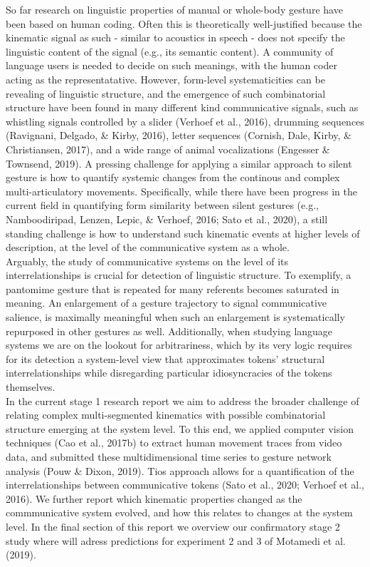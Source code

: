 \documentclass[
  man, noextraspace,floatsintext]{apa6}
\begin{document}
So far research on linguistic properties of manual or whole-body gesture have been based on human coding. Often this is theoretically well-justified because the kinematic signal as such - similar to acoustics in speech - does not specify the linguistic content of the signal (e.g., its semantic content). A community of language users is needed to decide on such meanings, with the human coder acting as the representatative. However, form-level systematicities can be revealing of linguistic structure, and the emergence of such combinatorial structure have been found in many different kind communicative signals, such as whistling signals controlled by a slider (Verhoef et al., 2016), drumming sequences (Ravignani, Delgado, \& Kirby, 2016), letter sequences (Cornish, Dale, Kirby, \& Christiansen, 2017), and a wide range of animal vocalizations (Engesser \& Townsend, 2019). A pressing challenge for applying a similar approach to silent gesture is how to quantify systemic changes from the continous and complex multi-articulatory movements. Specifically, while there have been progress in the current field in quantifying form similarity between silent gestures (e.g., Namboodiripad, Lenzen, Lepic, \& Verhoef, 2016; Sato et al., 2020), a still standing challenge is how to understand such kinematic events at higher levels of description, at the level of the communicative system as a whole.\\
Arguably, the study of communicative systems on the level of its interrelationships is crucial for detection of linguistic structure. To exemplify, a pantomime gesture that is repeated for many referents becomes saturated in meaning. An enlargement of a gesture trajectory to signal communicative salience, is maximally meaningful when such an enlargement is systematically repurposed in other gestures as well. Additionally, when studying language systems we are on the lookout for arbitrariness, which by its very logic requires for its detection a system-level view that approximates tokens' structural interrelationships while disregarding particular idiosyncracies of the tokens themselves.\\
In the current stage 1 research report we aim to address the broader challenge of relating complex multi-segmented kinematics with possible combinatorial structure emerging at the system level. To this end, we applied computer vision techniques (Cao et al., 2017b) to extract human movement traces from video data, and submitted these multidimensional time series to gesture network analysis (Pouw \& Dixon, 2019). Tios approach allows for a quantification of the interrelationships between communicative tokens (Sato et al., 2020; Verhoef et al., 2016). We further report which kinematic properties changed as the commmunicative system evolved, and how this relates to changes at the system level. In the final section of this report we overview our confirmatory stage 2 study where will adress predictions for experiment 2 and 3 of Motamedi et al. (2019). \pagebreak
\end{document}
